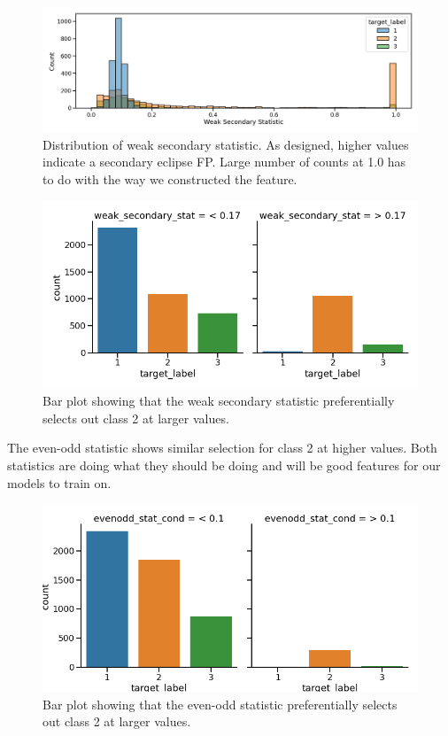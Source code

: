 \documentclass{article}
\begin{document}
  \begin{figure}[H]
	\begin{center}
		\includegraphics[totalheight=4cm]{figures/psec_hist.png}
	\end{center}
	\caption{Distribution of weak secondary statistic. As designed, higher values indicate a secondary eclipse FP. Large number of counts at 1.0 has to do with the way we constructed the feature. }
\end{figure}
  \begin{figure}[H]
	\begin{center}
		\includegraphics[totalheight=4cm]{figures/psec_class_diff.png}
	\end{center}
	\caption{Bar plot showing that the weak secondary statistic preferentially selects out class 2 at larger values. }
\end{figure}
The even-odd statistic shows similar selection for class 2 at higher values. Both statistics are doing what they should be doing and will be good features for our models to train on.
  \begin{figure}[H]
	\begin{center}
		\includegraphics[totalheight=4cm]{figures/evenodd_class_diff.png}
	\end{center}
	\caption{Bar plot showing that the even-odd statistic preferentially selects out class 2 at larger values. }
\end{figure}
\end{document}
